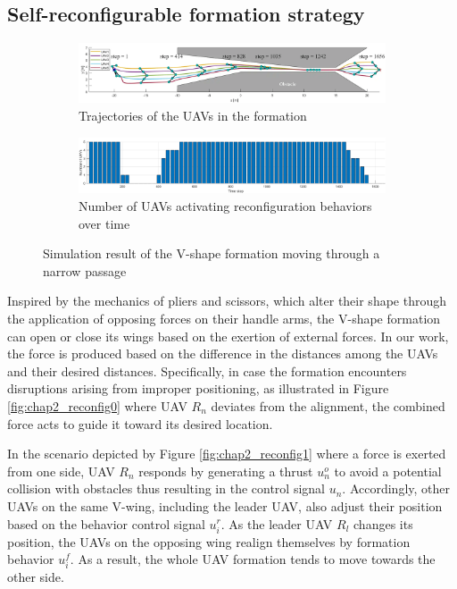 
\subsection{Self-reconfigurable formation strategy} 
\label{sec:0reconfig}
\begin{figure}
    \centering
    \begin{subfigure}[b]{\textwidth}
        \includegraphics[width=\textwidth]{paper1/images/result.png}
        \caption{Trajectories of the UAVs in the formation}
        \label{fig:chap2_motion}
    \end{subfigure}
    \begin{subfigure}[b]{\textwidth}
        \includegraphics[width=\textwidth]{paper1/images/number.png}
        \caption{Number of UAVs activating reconfiguration behaviors over time}
        \label{fig:chap2_number}
    \end{subfigure}
    \caption{Simulation result of the V-shape formation moving through a narrow passage}
    \label{fig:chap2_result}
\end{figure}

Inspired by the mechanics of pliers and scissors, which alter their shape through the application of opposing forces on their handle arms, the V-shape formation can open or close its wings based on the exertion of external forces. In our work, the force is produced based on the difference in the distances among the UAVs and their desired distances. Specifically, in case the formation encounters disruptions arising from improper positioning, as illustrated in Figure \ref{fig:chap2_reconfig0} where UAV $R_n$ deviates from the alignment, the combined force acts to guide it toward its desired location.

In the scenario depicted by Figure \ref{fig:chap2_reconfig1} where a force is exerted from one side, UAV $R_n$ responds by generating a thrust $u_n^o$ to avoid a potential collision with obstacles thus resulting in the control signal $u_n$. Accordingly, other UAVs on the same V-wing, including the leader UAV, also adjust their position based on the behavior control signal $u_i^r$. As the leader UAV $R_l$ changes its position, the UAVs on the opposing wing realign themselves by formation behavior $u_i^f$. As a result, the whole UAV formation tends to move towards the other side.


